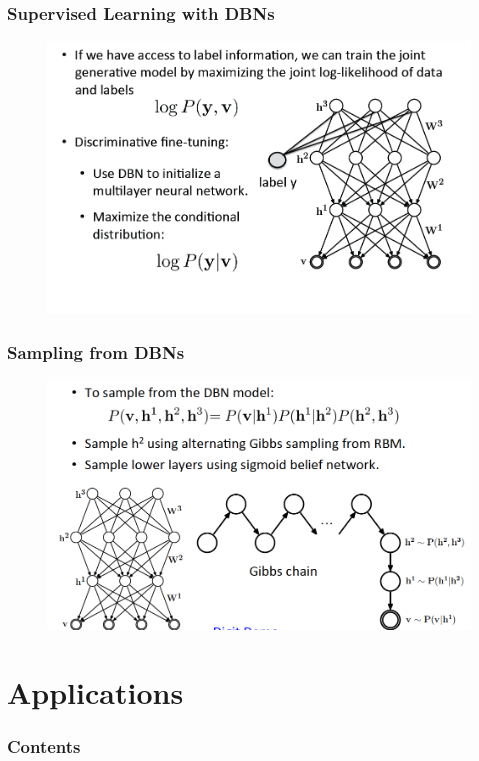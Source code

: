 \documentclass{beamer}
\begin{document}
\begin{frame}
\frametitle{Supervised Learning with DBNs}
\begin{figure}
      \includegraphics[width=1\textwidth]{figs/rbm36.png}
\end{figure}
\end{frame}

\begin{frame}
\frametitle{Sampling from DBNs}
\begin{figure}
      \includegraphics[width=1\textwidth]{figs/rbm37.png}
\end{figure}
\end{frame}

\section{Applications}

\begin{frame}
  \frametitle{Contents}
  \tableofcontents[currentsection]
\end{frame}
\end{document}
